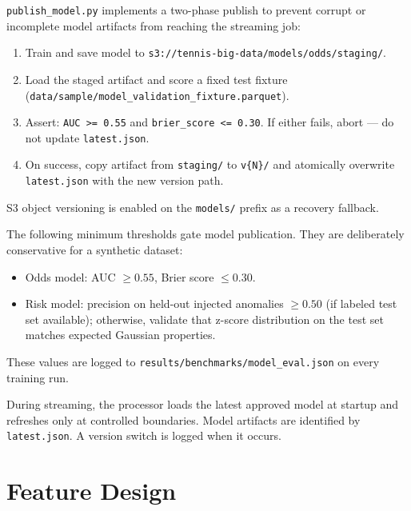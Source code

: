 \documentclass[11pt,a4paper]{article}
\begin{document}
\begin{criticalbox}
\texttt{publish\_model.py} implements a two-phase publish to prevent corrupt or incomplete
model artifacts from reaching the streaming job:
\begin{enumerate}[nosep]
  \item Train and save model to \texttt{s3://tennis-big-data/models/odds/staging/}.
  \item Load the staged artifact and score a fixed test fixture
    (\texttt{data/sample/model\_validation\_fixture.parquet}).
  \item Assert: \texttt{AUC >= 0.55} and \texttt{brier\_score <= 0.30}. If either fails,
    abort --- do not update \texttt{latest.json}.
  \item On success, copy artifact from \texttt{staging/} to \texttt{v\{N\}/} and atomically
    overwrite \texttt{latest.json} with the new version path.
\end{enumerate}
S3 object versioning is enabled on the \texttt{models/} prefix as a recovery fallback.
\end{criticalbox}

\begin{importantbox}
The following minimum thresholds gate model publication. They are deliberately conservative for a
synthetic dataset:
\begin{itemize}[nosep]
  \item Odds model: AUC $\geq 0.55$, Brier score $\leq 0.30$.
  \item Risk model: precision on held-out injected anomalies $\geq 0.50$ (if labeled test set
    available); otherwise, validate that z-score distribution on the test set matches expected
    Gaussian properties.
\end{itemize}
These values are logged to \texttt{results/benchmarks/model\_eval.json} on every training run.
\end{importantbox}

During streaming, the processor loads the latest approved model at startup and refreshes only at
controlled boundaries. Model artifacts are identified by \texttt{latest.json}. A version switch
is logged when it occurs.

\section{Feature Design}
\end{document}

